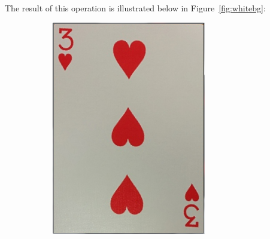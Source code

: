 \documentclass[a4paper,12pt,notitlepage]{article}
\begin{document}
		The result of this operation is illustrated below in Figure~\ref{fig:whitebg}:
		\begin{figure}[H]
			\centering
			\begin{subfigure}[b]{0.4\textwidth}
				\centering
				\includegraphics[width=\textwidth]{chris/image17}
				\caption{}
			\end{subfigure}
			\begin{subfigure}[b]{0.4\textwidth}
				\centering

\end{subfigure}
\end{figure}
\end{document}
